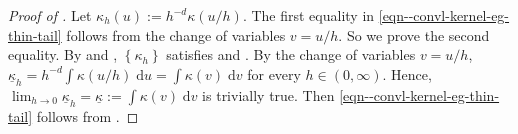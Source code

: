 \begin{proof}[Proof of ]
Let \(\kappa_{h} (u) := h^{- d} \kappa (u / h)\).
The first equality in \eqref{eqn--convl-kernel-eg-thin-tail} follows from
the change of variables \(v = u / h\).
So we prove the second equality.
By  and ,
\(\left\{ \kappa_{h} \right\}\) satisfies  and
.
By the change of variables \(v = u / h\), \(\underline{\kappa}_{h} = h^{- d}
\int \kappa (u / h) \; \mathrm{d} u = \int \kappa (v) \; \mathrm{d} v\) for
every \(h \in (0, \infty)\).
Hence, \(\lim_{h \to 0} \underline{\kappa}_{h} = \underline{\kappa} := \int
\kappa (v) \; \mathrm{d} v\) is trivially true.
Then \eqref{eqn--convl-kernel-eg-thin-tail} follows from
.
\end{proof}



